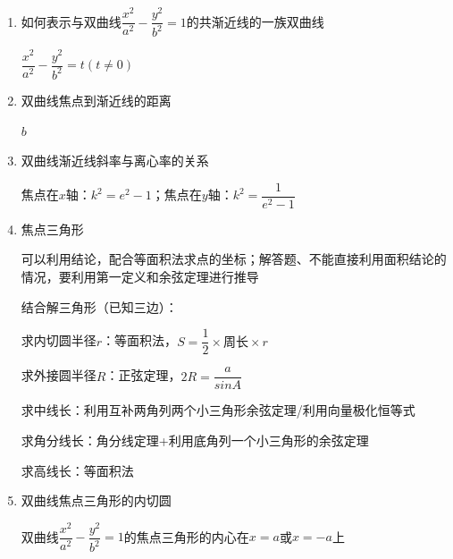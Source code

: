 \begin{enumerate}
    \item 如何表示与双曲线$\dfrac{x^2}{a^2} - \dfrac{y^2}{b^2} = 1$的共渐近线的一族双曲线
    \begin{jieda}
        $\dfrac{x^2}{a^2} - \dfrac{y^2}{b^2} = t(t \neq 0)$
    \end{jieda}

    \item 双曲线焦点到渐近线的距离
    \begin{jieda}
        $b$
    \end{jieda}

    \item 双曲线渐近线斜率与离心率的关系
    \begin{jieda}
        焦点在$x$轴：$k^2 = e^2 - 1$；焦点在$y$轴：$k^2 = \dfrac{1}{e^2-1}$
    \end{jieda}

    \item 焦点三角形
    \begin{jieda}

        可以利用结论，配合等面积法求点的坐标；解答题、不能直接利用面积结论的情况，要利用第一定义和余弦定理进行推导

        结合解三角形（已知三边）：

        求内切圆半径$r$：等面积法，$S = \dfrac{1}{2} \times \text{周长} \times r$
        
        求外接圆半径$R$：正弦定理，$2R = \dfrac{a}{sinA}$
        
        求中线长：利用互补两角列两个小三角形余弦定理/利用向量极化恒等式

        求角分线长：角分线定理+利用底角列一个小三角形的余弦定理

        求高线长：等面积法
    \end{jieda}

    \item 双曲线焦点三角形的内切圆
    \begin{jieda}
        双曲线$\dfrac{x^2}{a^2} - \dfrac{y^2}{b^2} = 1$的焦点三角形的内心在$x = a$或$x = -a$上
    \end{jieda}


\end{enumerate}
